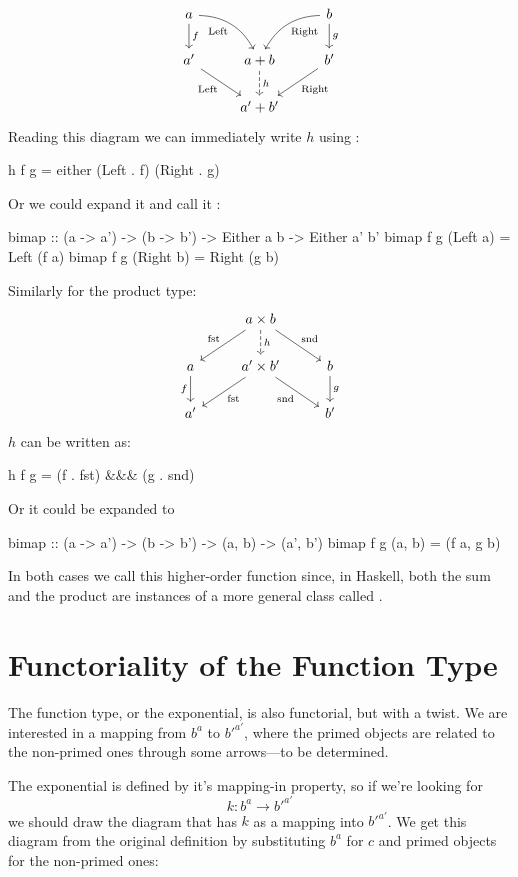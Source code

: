 \documentclass[DaoFP]{subfiles}
\begin{document}
\[
 \begin{tikzcd}
 a
 \arrow[d, "f"]
 \arrow[dr,  bend left, "\text{Left}"']
  && b
 \arrow[d, "g"]
 \arrow[dl, bend right, "\text{Right}"]
 \\
 a'
 \arrow[rd, "\text{Left}"']
&a + b
\arrow[d, dashed, "h"]
& b'
\arrow[ld, "\text{Right}"]
\\
& a' + b'
 \end{tikzcd}
\]
Reading this diagram we can immediately write $h$ using :
\begin{haskell}
h f g = either (Left . f) (Right . g)
\end{haskell}
Or we could expand it and call it :
\begin{haskell}
bimap :: (a -> a') -> (b -> b') -> Either a b -> Either a' b'
bimap f g (Left  a) = Left  (f a)
bimap f g (Right b) = Right (g b)
\end{haskell}
Similarly for the product type:
\[
 \begin{tikzcd}
 & a \times b
\arrow[d, dashed, "h"]
 \arrow[dl,  "\text{fst}"']
 \arrow[dr,   "\text{snd}"]
\\
a
\arrow[d, "f"']
&a' \times b'
 \arrow[dl,  "\text{fst}"]
  \arrow[dr,   "\text{snd}"']
& b
\arrow[d, "g"]
\\
a' && b'
 \end{tikzcd}
\]
$h$ can be written as:
\begin{haskell}
h f g = (f . fst) &&& (g . snd)
\end{haskell}
Or it could be expanded to
\begin{haskell}
bimap :: (a -> a') -> (b -> b') -> (a, b) -> (a', b')
bimap f g (a, b) = (f a, g b)
\end{haskell}
In both cases we call this higher-order function  since, in Haskell, both the sum and the product are instances of a more general class called .

\section{Functoriality of the Function Type}

The function type, or the exponential, is also functorial, but with a twist. We are interested in a mapping from $b^a$ to $b'^{a'}$, where the primed objects are related to the non-primed ones through some arrows---to be determined. 

The exponential is defined by it's mapping-in property, so if we're looking for
\[k \colon b^a \to b'^{a'} \]
we should draw the diagram that has $k$ as a mapping into $b'^{a'}$. We get this diagram from the original definition by substituting $b^a$ for $c$ and primed objects for the non-primed ones:
\end{document}
